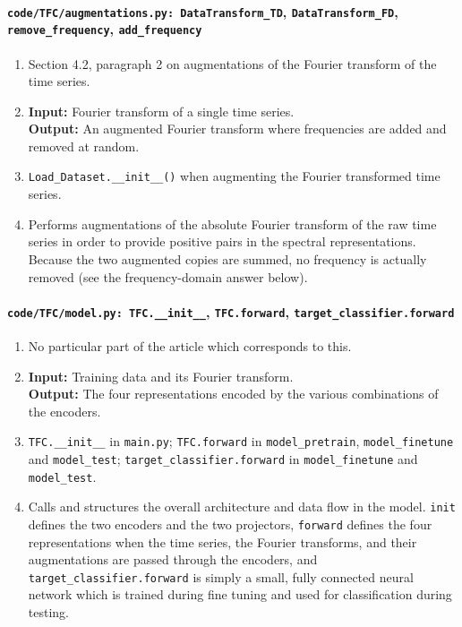 \documentclass[a4paper,11pt]{article}
\newcommand{\code}[1]{\texttt{#1}}
\begin{document}
\paragraph{\code{code/TFC/augmentations.py: DataTransform\_TD}, \code{DataTransform\_FD}, \code{remove\_frequency}, \code{add\_frequency}}
\begin{enumerate}[label=(\roman*)]
\item Section 4.2, paragraph 2 on augmentations of the Fourier transform of the time series.
\item 
    \textbf{Input:} Fourier transform of a single time series. \\
    \textbf{Output:} An augmented Fourier transform where frequencies are added and removed at random.
\item \texttt{Load\_Dataset.\_\_init\_\_()} when augmenting the Fourier transformed time series.
\item Performs augmentations of the absolute Fourier transform of the raw time series in order to provide positive pairs in the spectral representations. Because the two augmented copies are summed, no frequency is actually removed (see the frequency-domain answer below).
\end{enumerate}

\paragraph{\code{code/TFC/model.py: TFC.\_\_init\_\_}, \code{TFC.forward}, \code{target\_classifier.forward}}
\begin{enumerate}[label=(\roman*)]
\item No particular part of the article which corresponds to this.
\item 
    \textbf{Input:} Training data and its Fourier transform.\\
    \textbf{Output:} The four representations encoded by the various combinations of the encoders.
\item \texttt{TFC.\_\_init\_\_} in \texttt{main.py}; \texttt{TFC.forward} in \texttt{model\_pretrain}, \texttt{model\_finetune} and \texttt{model\_test}; \texttt{target\_classifier.forward} in \texttt{model\_finetune} and \texttt{model\_test}.
\item Calls and structures the overall architecture and data flow in the model. \texttt{init} defines the two encoders and the two projectors, \texttt{forward} defines the four representations when the time series, the Fourier transforms, and their augmentations are passed through the encoders, and \texttt{target\_classifier.forward} is simply a small, fully connected neural network which is trained during fine tuning and used for classification during testing.
\end{enumerate}
\end{document}
